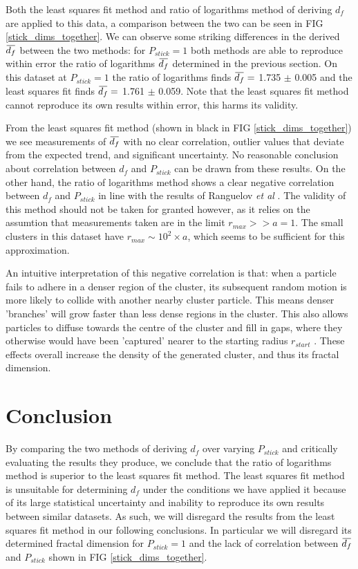 \documentclass[10pt, twocolumn]{article} %
\newcommand{\overbar}[1]{\mkern 1.5mu\overline{\mkern-1.5mu#1\mkern-1.5mu}\mkern 1.5mu}
\begin{document}
  Both the least squares fit method and ratio of logarithms method of deriving $d_f$ are applied to this data, a comparison between the two can be seen in FIG \ref{stick_dims_together}. We can observe some striking differences in the derived $\overbar{d_f}$ between the two methods: for $P_{stick}=1$ both methods are able to reproduce within error the ratio of logarithms $\overbar{d_f}$ determined in the previous section. On this dataset at $P_{stick} = 1$ the ratio of logarithms finds $\overbar{d_f} =$ 1.735 $\pm$ 0.005 and the least squares fit finds $\overbar{d_f} = $ 1.761 $\pm$ 0.059. Note that the least squares fit method cannot reproduce its own results within error, this harms its validity.
  
  From the least squares fit method (shown in black in FIG \ref{stick_dims_together}) we see measurements of $\overbar{d_f}$ with no clear correlation, outlier values that deviate from the expected trend, and significant uncertainty. No reasonable conclusion about correlation between $d_f$ and $P_{stick}$ can be drawn from these results. On the other hand, the ratio of logarithms method shows a clear negative correlation between $d_f$ and $P_{stick}$ in line with the results of Ranguelov \textit{et al} \cite{Ranguelov_2011}. The validity of this method should not be taken for granted however, as it relies on the assumtion that measurements taken are in the limit $r_{max} >> a=1$. The small clusters in this dataset have $r_{max} \sim 10^2 \times a$, which seems to be sufficient for this approximation.

  An intuitive interpretation of this negative correlation is that: when a particle fails to adhere in a denser region of the cluster, its subsequent random motion is more likely to collide with another nearby cluster particle. This means denser 'branches' will grow faster than less dense regions in the cluster. This also allows particles to diffuse towards the centre of the cluster and fill in gaps, where they otherwise would have been 'captured' nearer to the starting radius $r_{start}$ \cite{Ranguelov_2011}. These effects overall increase the density of the generated cluster, and thus its fractal dimension.

\section*{Conclusion}

  By comparing the two methods of deriving $d_f$ over varying $P_{stick}$ and critically evaluating the results they produce, we conclude that the ratio of logarithms method is superior to the least squares fit method. The least squares fit method is unsuitable for determining $d_f$ under the conditions we have applied it because of its large statistical uncertainty and inability to reproduce its own results between similar datasets. As such, we will disregard the results from the least squares fit method in our following conclusions. In particular we will disregard its determined fractal dimension for $P_{stick} = 1$ and the lack of correlation between $\overbar{d_f}$ and $P_{stick}$ shown in FIG \ref{stick_dims_together}.
\end{document}

